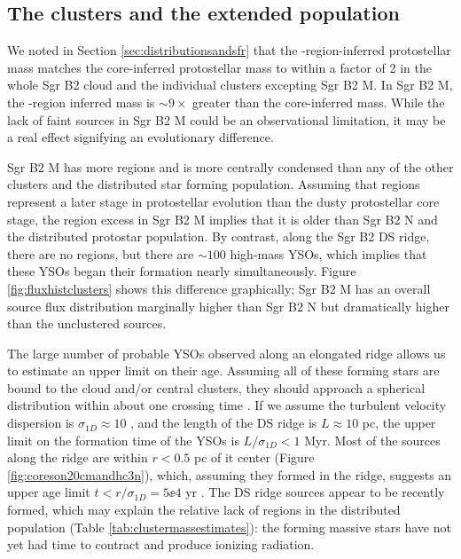 \documentclass[twocolumn]{aastex61}
\begin{document}
\subsection{The clusters and the extended population}
\label{sec:clustersandextended}
We noted in Section \ref{sec:distributionsandsfr} that the \hii-region-inferred
protostellar mass matches the core-inferred protostellar mass to within a
factor of 2 in the whole Sgr B2 cloud and the individual clusters excepting Sgr
B2 M.  In Sgr B2 M, the \hii-region inferred mass is $\sim9\times$ greater than
the core-inferred mass.  While the lack of faint sources in Sgr B2 M could
be an observational limitation, it may be a real effect signifying an evolutionary
difference.

Sgr B2 M has more \hii regions and is more centrally condensed than any of the
other clusters and the distributed star forming population.  Assuming that \hii
regions represent a later stage in protostellar evolution than the dusty
protostellar core stage, the \hii region excess in Sgr B2 M implies that it is
older than Sgr B2 N and the distributed protostar population.  By contrast,
along the Sgr B2 DS ridge, there are no \hii regions, but there are $\sim100$
high-mass YSOs, which implies that these YSOs began their formation
nearly simultaneously.  Figure \ref{fig:fluxhistclusters} shows this difference
graphically; Sgr B2 M has an overall source flux distribution marginally higher
than Sgr B2 N but dramatically higher than the unclustered sources.

The large number of probable YSOs observed along an elongated ridge allows us
to estimate an upper limit on their age.  Assuming all of these forming stars
are bound to the cloud and/or central clusters, they should approach a
spherical distribution within about one crossing time \citep{Efremov1998a}.  If
we assume the turbulent velocity dispersion is $\sigma_{1D}\approx10$ \kms
\citep[e.g.,][]{Henshaw2016a}, and the length of the DS ridge is $L\approx10$
pc, the upper limit on the formation time of the YSOs is $L/\sigma_{1D}<1$ Myr.
Most of the sources along the ridge are within $r<0.5$ pc of it center (Figure
\ref{fig:coreson20cmandhc3n}),
which, assuming they
formed in the ridge, suggests an upper age limit $t<r/\sigma_{1D}=5\ee{4}$ yr
\citep[however, the stars may have a lower velocity dispersion by a factor of
5-10, implying a more conservative upper age limit is $t<0.5$
Myr; ][]{Offner2009c}.
The DS ridge sources appear to be recently formed, which may explain the
relative lack of \hii regions in the distributed population (Table
\ref{tab:clustermassestimates}): the forming massive stars have not yet had
time to contract and produce ionizing radiation.
\end{document}
